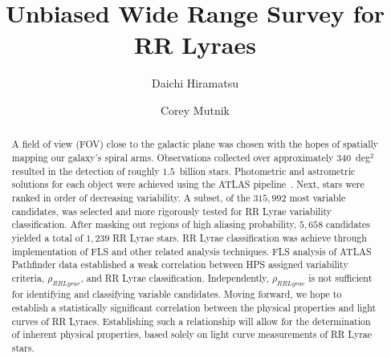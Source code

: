 \documentclass[aps,prb,twocolumn,superscriptaddress]{revtex4-1}
\begin{document}
\title{Unbiased Wide Range Survey for RR Lyraes}


%


\author{Daichi Hiramatsu}
\author{Corey Mutnik}



\begin{abstract}
A field of view (FOV) close to the galactic plane was chosen with the hopes of spatially mapping our galaxy's spiral arms.  
Observations collected over approximately $340$~deg$^{2}$ resulted in the detection of roughly $1.5$~billion stars.  Photometric and astrometric solutions for each object were achieved using the ATLAS pipeline~\cite{gri}.  Next, stars were ranked in order of decreasing variability.  A subset, of the $315,992$ most variable candidates, was selected and more rigorously tested for RR Lyrae variability classification.  After masking out regions of high aliasing probability, $5,658$ candidates yielded a total of $1,239$ RR Lyrae stars.  RR Lyrae classification was achieve through implementation of FLS and other related analysis techniques.  
FLS analysis of ATLAS Pathfinder data established a weak correlation between HPS assigned variability criteria, $\rho_{RRLyrae}$, and RR Lyrae classification.  Independently, $\rho_{RRLyrae}$ is not sufficient for identifying and classifying variable candidates.  
Moving forward, we hope to establish a statistically significant correlation between the physical properties and light curves of RR Lyraes.  
Establishing such a relationship will allow for the determination of inherent physical properties, based solely on light curve measurements of RR Lyrae stars.
\end{abstract}
\end{document}
